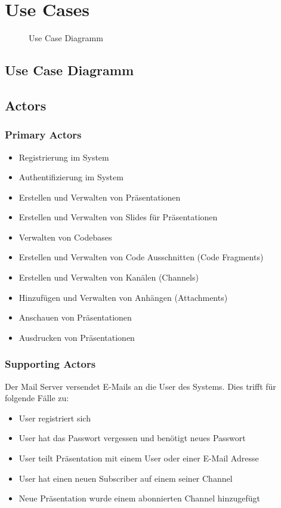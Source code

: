 \chapter{Use Cases}
\label{chap:usecases}

\begin{figure}[htbp]
	\centering
    
    \caption{Use Case Diagramm}
\end{figure}


\section{Use Case Diagramm}

\section{Actors}
\subsection{Primary Actors}
\begin{itemize}
	\item Registrierung im System
	\item Authentifizierung im System
	\item Erstellen und Verwalten von Präsentationen
	\item Erstellen und Verwalten von Slides für Präsentationen
	\item Verwalten von Codebases
	\item Erstellen und Verwalten von Code Ausschnitten (Code Fragments)
	\item Erstellen und Verwalten von Kanälen (Channels)
	\item Hinzufügen und Verwalten von Anhängen (Attachments)
\end{itemize}

\begin{itemize}
	\item Anschauen von Präsentationen
	\item Ausdrucken von Präsentationen
\end{itemize}

\subsection{Supporting Actors}
Der Mail Server versendet E-Mails an die User des Systems. Dies trifft für folgende Fälle zu:
\begin{itemize}
	\item User registriert sich
	\item User hat das Passwort vergessen und benötigt neues Passwort
	\item User teilt Präsentation mit einem User oder einer E-Mail Adresse
	\item User hat einen neuen Subscriber auf einem seiner Channel
	\item Neue Präsentation wurde einem abonnierten Channel hinzugefügt
\end{itemize}

